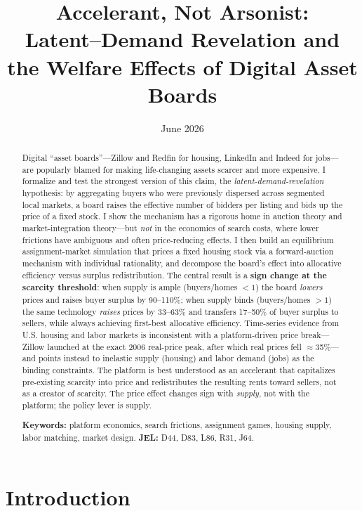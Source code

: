 \documentclass[11pt]{article}
\title{\textbf{Accelerant, Not Arsonist:}\\[2pt]
\large Latent--Demand Revelation and the Welfare Effects of Digital Asset Boards}
\author{}
\date{June 2026}
\begin{document}
\maketitle

\begin{abstract}
\noindent
Digital ``asset boards''---Zillow and Redfin for housing, LinkedIn and Indeed for jobs---are
popularly blamed for making life-changing assets scarcer and more expensive. I formalize and
test the strongest version of this claim, the \emph{latent-demand-revelation} hypothesis: by
aggregating buyers who were previously dispersed across segmented local markets, a board raises
the effective number of bidders per listing and bids up the price of a fixed stock. I show the
mechanism has a rigorous home in auction theory and market-integration theory---but \emph{not} in
the economics of search costs, where lower frictions have ambiguous and often price-reducing
effects. I then build an equilibrium assignment-market simulation that prices a fixed housing
stock via a forward-auction mechanism with individual rationality, and decompose the board's
effect into allocative efficiency versus surplus redistribution. The central result is a
\textbf{sign change at the scarcity threshold}: when supply is ample (buyers/homes $<1$) the board
\emph{lowers} prices and raises buyer surplus by 90--110\%; when supply binds (buyers/homes $>1$)
the same technology \emph{raises} prices by 33--63\% and transfers 17--50\% of buyer surplus to
sellers, while always achieving first-best allocative efficiency. Time-series evidence from U.S.
housing and labor markets is inconsistent with a platform-driven price break---Zillow launched at
the exact 2006 real-price peak, after which real prices fell $\approx$35\%---and points instead to
inelastic supply (housing) and labor demand (jobs) as the binding constraints. The platform is
best understood as an accelerant that capitalizes pre-existing scarcity into price and redistributes
the resulting rents toward sellers, not as a creator of scarcity. The price effect changes sign with
\emph{supply}, not with the platform; the policy lever is supply.

\medskip
\noindent\textbf{Keywords:} platform economics, search frictions, assignment games, housing supply,
labor matching, market design. \quad \textbf{JEL:} D44, D83, L86, R31, J64.
\end{abstract}

\section{Introduction}
\end{document}
